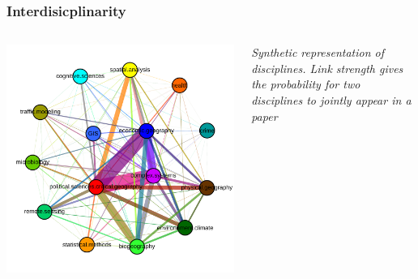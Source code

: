 \begin{frame}
\frametitle{Interdisicplinarity}

\begin{columns}
\begin{column}{0.6\textwidth}
\includegraphics[width=\textwidth]{figures/synththemcyb}
\end{column}
\begin{column}{0.4\textwidth}
\justify
\textit{Synthetic representation of disciplines. Link strength gives the probability for two disciplines to jointly appear in a paper}
\end{column}
\end{columns}



\end{frame}




